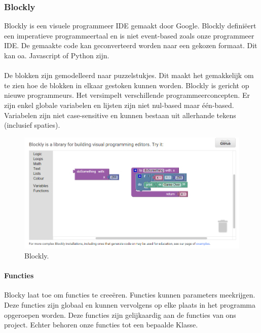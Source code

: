 \documentclass[]{article}
\begin{document}
\subsubsection{Blockly}
Blockly \cite{blockly} is een visuele programmeer IDE gemaakt door Google. Blockly defini\"{e}ert een imperatieve programmeertaal en is niet event-based zoals onze programmeer IDE. De gemaakte code kan geconverteerd worden naar een gekozen formaat. Dit kan oa. Javascript of Python zijn. \\\\
De blokken zijn gemodelleerd naar puzzelstukjes. Dit maakt het gemakkelijk om te zien hoe de blokken in elkaar gestoken kunnen worden. Blockly is gericht op nieuwe programmeurs. Het versimpelt verschillende programmeerconcepten. Er zijn enkel globale variabelen en lijsten zijn niet nul-based maar \'{e}\'{e}n-based. Variabelen zijn niet case-sensitive en kunnen bestaan uit allerhande tekens (inclusief spaties).
\begin{figure}[H]
\centering
\includegraphics[width=1.2\textwidth]{./BestaandeSoftware/blockly.PNG}
\caption{Blockly.}
\end{figure}
\paragraph{Functies}
Blocky laat toe om functies te cree\"{e}ren. Functies kunnen parameters meekrijgen. Deze functies zijn globaal en kunnen vervolgens op elke plaats in het programma opgeroepen worden. Deze functies zijn gelijkaardig aan de functies van ons project. Echter behoren onze functies tot een bepaalde Klasse.
\end{document}
